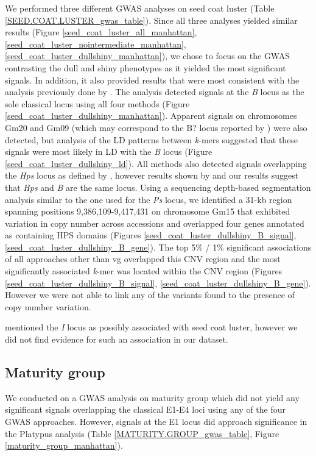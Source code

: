 We performed three different GWAS analyses on seed coat luster (Table
\ref{SEED.COAT.LUSTER_gwas_table}). Since all three analyses yielded similar results
(Figure \ref{seed_coat_luster_all_manhattan},
\ref{seed_coat_luster_nointermediate_manhattan},
\ref{seed_coat_luster_dullshiny_manhattan}), we chose to focus on the
GWAS contrasting the dull and shiny phenotypes as it yielded the most
significant signals. In addition, it also provided results that were most consistent with the
analysis previously done by \cite{bandillo2017}. The analysis detected
signals at the \emph{B} locus as the sole classical locus using all four
methods (Figure \ref{seed_coat_luster_dullshiny_manhattan}). Apparent signals
on chromosomes Gm20 and Gm09 (which may correspond to the B? locus reported by
\cite{bandillo2017}) were also detected, but analysis of the LD patterns
between \emph{k}-mers suggested that these signals were most likely in LD with
the \emph{B} locus (Figure \ref{seed_coat_luster_dullshiny_ld}). All methods
also detected signals overlapping the \emph{Hps} locus as defined by
\cite{bandillo2017}, however results shown by \cite{gijzen2003} and our results
suggest that \emph{Hps} and \emph{B} are the same locus. Using a sequencing depth-based segmentation analysis
similar to the one used for the \emph{Ps} locus, we identified a 31-kb region
spanning positions 9,386,109-9,417,431 on chromosome Gm15 that exhibited
variation in copy number across accessions and overlapped four genes annotated
as containing HPS domains (Figures \ref{seed_coat_luster_dullshiny_B_signal},
\ref{seed_coat_luster_dullshiny_B_gene}). The top 5\% / 1\% significant
associations of all approaches other than vg overlapped this CNV region and the
most significantly associated \emph{k}-mer was located within the CNV region
(Figures \ref{seed_coat_luster_dullshiny_B_signal},
\ref{seed_coat_luster_dullshiny_B_gene}). However we were not able to link any
of the variants found to the presence of copy number variation.


\cite{bandillo2017} mentioned the \textit{I} locus as possibly associated
with seed coat luster, however we did not find evidence for such an association
in our dataset.

\subsection*{Maturity group}
\label{sv-gwas-maturity-group}

We conducted on a GWAS analysis on maturity group which did not yield any significant signals
overlapping the classical E1-E4 loci using any of the four GWAS approaches.
However, signals at the E1 locus did approach significance in the Platypus
analysis (Table \ref{MATURITY.GROUP_gwas_table}, Figure \ref{maturity_group_manhattan}).

